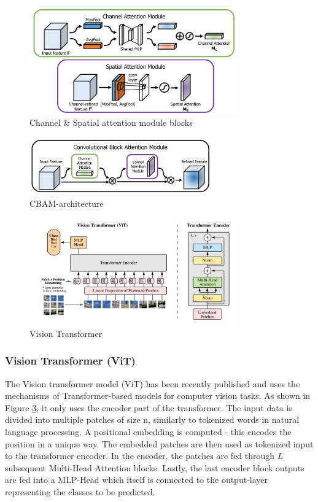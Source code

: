 \begin{figure}[H]
    \centering
    \includegraphics[width=0.8\textwidth]{Figures/cbam_modules.png}
    \caption{Channel \& Spatial attention module blocks \cite{woo_cbam_2018}}
    \label{fig:cbam_modules}
\end{figure}

\begin{figure}[H]
    \centering
    \includegraphics[width=0.7\textwidth]{Figures/cbam_modul.png}
    \caption{CBAM-architecture \cite{woo_cbam_2018}}
    \label{fig:cbam}
\end{figure}


\begin{figure}[H]
    \centering
    \includegraphics[width=0.8\textwidth]{Figures/ViT.png}
    \caption{Vision Transformer \cite{dosovitskiy_image_2021}}
    \label{fig:vit_model}
\end{figure}

\subsubsection{Vision Transformer (ViT)}
The Vision transformer model (ViT) has been recently published \cite{dosovitskiy_image_2021} and uses the mechanisms of Transformer-based models for computer vision tasks. As shown in Figure \ref{fig:vit_model}, it only uses the encoder part of the transformer. The input data is divided into multiple patches of size n, similarly to tokenized words in natural language processing. A positional embedding is computed - this encodes the position in a unique way. The embedded patches are then used as tokenized input to the transformer encoder. In the encoder, the patches are fed through $L$ subsequent Multi-Head Attention blocks. Lastly, the last encoder block outputs are fed into a MLP-Head which itself is connected to the output-layer representing the classes to be predicted.
